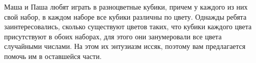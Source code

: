 Маша и Паша любят играть в разноцветные кубики, причем у каждого из них свой набор, в каждом наборе все кубики различны по цвету. Однажды ребята заинтересовались, сколько существуют цветов таких, что кубики каждого цвета присутствуют в обоих наборах, для этого они занумеровали все цвета случайными числами. На этом их энтузиазм иссяк, поэтому вам предлагается помочь им в оставшейся части.
